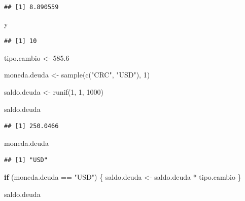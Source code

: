 \documentclass[
  12pt,
]{book}
\newenvironment{Shaded}{\begin{snugshade}}{\end{snugshade}}
\newcommand{\ControlFlowTok}[1]{\textcolor[rgb]{0.13,0.29,0.53}{\textbf{#1}}}
\newcommand{\DecValTok}[1]{\textcolor[rgb]{0.00,0.00,0.81}{#1}}
\newcommand{\FloatTok}[1]{\textcolor[rgb]{0.00,0.00,0.81}{#1}}
\newcommand{\FunctionTok}[1]{\textcolor[rgb]{0.00,0.00,0.00}{#1}}
\newcommand{\NormalTok}[1]{#1}
\newcommand{\OtherTok}[1]{\textcolor[rgb]{0.56,0.35,0.01}{#1}}
\newcommand{\SpecialCharTok}[1]{\textcolor[rgb]{0.00,0.00,0.00}{#1}}
\newcommand{\StringTok}[1]{\textcolor[rgb]{0.31,0.60,0.02}{#1}}
\begin{document}
\begin{verbatim}
## [1] 8.890559
\end{verbatim}

\begin{Shaded}
\begin{Highlighting}[]
\NormalTok{y}
\end{Highlighting}
\end{Shaded}

\begin{verbatim}
## [1] 10
\end{verbatim}

\begin{Shaded}
\begin{Highlighting}[]
\NormalTok{tipo.cambio }\OtherTok{\textless{}{-}} \FloatTok{585.6}

\NormalTok{moneda.deuda }\OtherTok{\textless{}{-}} \FunctionTok{sample}\NormalTok{(}\FunctionTok{c}\NormalTok{(}\StringTok{"CRC"}\NormalTok{, }\StringTok{"USD"}\NormalTok{), }\DecValTok{1}\NormalTok{)}

\NormalTok{saldo.deuda }\OtherTok{\textless{}{-}} \FunctionTok{runif}\NormalTok{(}\DecValTok{1}\NormalTok{, }\DecValTok{1}\NormalTok{, }\DecValTok{1000}\NormalTok{)}

\NormalTok{saldo.deuda}
\end{Highlighting}
\end{Shaded}

\begin{verbatim}
## [1] 250.0466
\end{verbatim}

\begin{Shaded}
\begin{Highlighting}[]
\NormalTok{moneda.deuda}
\end{Highlighting}
\end{Shaded}

\begin{verbatim}
## [1] "USD"
\end{verbatim}

\begin{Shaded}
\begin{Highlighting}[]
\ControlFlowTok{if}\NormalTok{ (moneda.deuda }\SpecialCharTok{==} \StringTok{"USD"}\NormalTok{) \{}
\NormalTok{  saldo.deuda }\OtherTok{\textless{}{-}}\NormalTok{ saldo.deuda }\SpecialCharTok{*}\NormalTok{ tipo.cambio}
\NormalTok{\}}


\NormalTok{saldo.deuda}
\end{Highlighting}
\end{Shaded}
\end{document}
